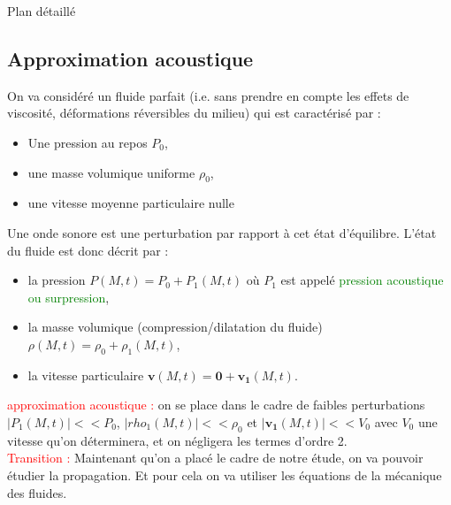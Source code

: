 \begin{reportBlock}{Plan détaillé}
  \subsection{Approximation acoustique}   
  On va considéré un fluide parfait (i.e. sans prendre en compte les effets de viscosité, déformations réversibles du milieu) qui est caractérisé par :
  \begin{itemize}
      \item Une pression au repos $P_0$,
      \item une masse volumique uniforme $\rho_0$,
      \item une vitesse moyenne particulaire nulle
  \end{itemize}
  Une onde sonore est une perturbation par rapport à cet état d'équilibre. L'état du fluide est donc décrit par :
  \begin{itemize}
      \item la pression $P(M,t)=P_0+P_1(M,t)$ où $P_1$ est appelé \textcolor{green}{pression acoustique ou surpression},
      \item la masse volumique (compression/dilatation du fluide) $\rho(M,t)=\rho_0 + \rho_1(M,t)$,
      \item la vitesse particulaire $\mathbf{v}(M,t)=\mathbf{0}+\mathbf{v_{1}}(M,t)$.
  \end{itemize}
  \textcolor{red}{approximation acoustique :} on se place dans le cadre de faibles perturbations $\lvert P_1(M,t) \rvert << P_0$, $\lvert rho_1(M,t) \rvert << \rho_0$ et $\lvert \mathbf{v_1}(M,t) \rvert << V_0$ avec $V_0$ une vitesse qu'on déterminera, et on négligera les termes d'ordre 2.\\
  
  \textcolor{red}{Transition :} Maintenant qu'on a placé le cadre de notre étude, on va pouvoir étudier la propagation. Et pour cela on va utiliser les équations de la mécanique des fluides.
  

\end{reportBlock}
